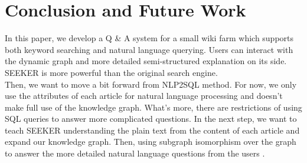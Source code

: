 \chapter{Conclusion and Future Work}
\vspace{-5pt}
In this paper, we develop a Q \& A system for a small wiki farm which supports both keyword searching and natural language querying. Users can interact with the dynamic graph and more detailed semi-structured explanation on its side. SEEKER is more powerful than the original search engine.\\
\indent Then, we want to move a bit forward from NLP2SQL method. For now, we only use the attributes of each article for natural language processing and doesn't make full use of the knowledge graph. What's more, there are restrictions of using SQL queries to answer more complicated questions. In the next step, we want to teach SEEKER understanding the plain text from the content of each article and expand our knowledge graph. Then, using subgraph isomorphism over the graph to answer the more detailed natural language questions from the users \cite{hu2018answering}. 
\vspace{20pt}
